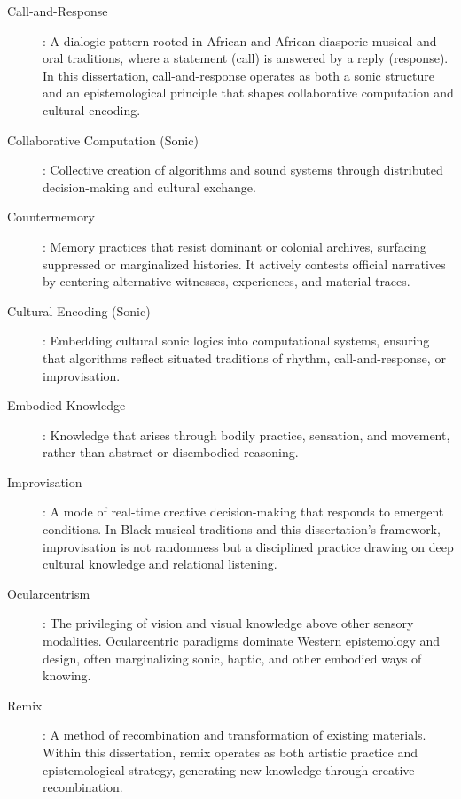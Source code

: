 \begin{description}
	\item[Call-and-Response]: A dialogic pattern rooted in African and African diasporic musical and oral traditions, where a statement (call) is answered by a reply (response). In this dissertation, call-and-response operates as both a sonic structure and an epistemological principle that shapes collaborative computation and cultural encoding.
	
	\item[Collaborative Computation (Sonic)]: Collective creation of algorithms and sound systems through distributed decision-making and cultural exchange.
	
	\item[Countermemory]: Memory practices that resist dominant or colonial archives, surfacing suppressed or marginalized histories. It actively contests official narratives by centering alternative witnesses, experiences, and material traces.
	
	\item[Cultural Encoding (Sonic)]: Embedding cultural sonic logics into computational systems, ensuring that algorithms reflect situated traditions of rhythm, call-and-response, or improvisation.
	
	\item[Embodied Knowledge]: Knowledge that arises through bodily practice, sensation, and movement, rather than abstract or disembodied reasoning.
	
	\item[Improvisation]: A mode of real-time creative decision-making that responds to emergent conditions. In Black musical traditions and this dissertation's framework, improvisation is not randomness but a disciplined practice drawing on deep cultural knowledge and relational listening.
	
	\item[Ocularcentrism]: The privileging of vision and visual knowledge above other sensory modalities. Ocularcentric paradigms dominate Western epistemology and design, often marginalizing sonic, haptic, and other embodied ways of knowing.
	
	\item[Remix]: A method of recombination and transformation of existing materials. Within this dissertation, remix operates as both artistic practice and epistemological strategy, generating new knowledge through creative recombination.
\end{description}